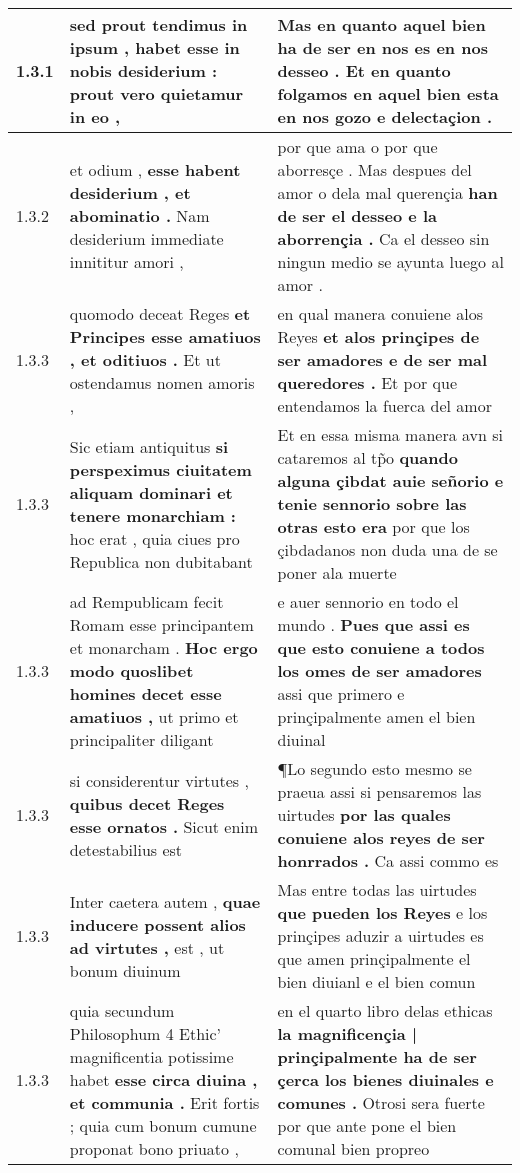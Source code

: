 \begin{tabular}{|p{1cm}|p{6.5cm}|p{6.5cm}|}
1.3.1 & sed prout tendimus in ipsum , \textbf{ habet esse in nobis desiderium : } prout vero quietamur in eo , & Mas en quanto aquel bien ha de ser \textbf{ en nos es en nos desseo . } Et en quanto folgamos en aquel bien esta en nos gozo e delectaçion . \\\hline
1.3.2 & et odium , \textbf{ esse habent desiderium , et abominatio . } Nam desiderium immediate innititur amori , & por que ama o por que aborresçe . Mas despues del amor o dela mal querençia \textbf{ han de ser el desseo e la aborrençia . } Ca el desseo sin ningun medio se ayunta luego al amor . \\\hline
1.3.3 & quomodo deceat Reges \textbf{ et Principes esse amatiuos , et oditiuos . } Et ut ostendamus nomen amoris , & en qual manera conuiene alos Reyes \textbf{ et alos prinçipes de ser amadores e de ser mal queredores . } Et por que entendamos la fuerca del amor \\\hline
1.3.3 & Sic etiam antiquitus \textbf{ si perspeximus ciuitatem aliquam dominari et tenere monarchiam : } hoc erat , quia ciues pro Republica non dubitabant & Et en essa misma manera avn si cataremos al tp̃o \textbf{ quando alguna çibdat auie señorio e tenie sennorio sobre las otras esto era } por que los çibdadanos non duda una de se poner ala muerte \\\hline
1.3.3 & ad Rempublicam fecit Romam esse principantem et monarcham . \textbf{ Hoc ergo modo quoslibet homines decet esse amatiuos , } ut primo et principaliter diligant & e auer sennorio en todo el mundo . \textbf{ Pues que assi es que esto conuiene a todos los omes de ser amadores } assi que primero e prinçipalmente amen el bien diuinal \\\hline
1.3.3 & si considerentur virtutes , \textbf{ quibus decet Reges esse ornatos . } Sicut enim detestabilius est & ¶Lo segundo esto mesmo se praeua assi si pensaremos las uirtudes \textbf{ por las quales conuiene alos reyes de ser honrrados . } Ca assi commo es \\\hline
1.3.3 & Inter caetera autem , \textbf{ quae inducere possent alios ad virtutes , } est , ut bonum diuinum & Mas entre todas las uirtudes \textbf{ que pueden los Reyes } e los prinçipes aduzir a uirtudes es que amen prinçipalmente el bien diuianl e el bien comun \\\hline
1.3.3 & quia secundum Philosophum 4 Ethic’ magnificentia potissime habet \textbf{ esse circa diuina , et communia . } Erit fortis ; quia cum bonum cumune proponat bono priuato , & en el quarto libro delas ethicas \textbf{ la magnificençia | prinçipalmente ha de ser çerca los bienes diuinales e comunes . } Otrosi sera fuerte por que ante pone el bien comunal bien propreo \\\hline

\end{tabular}

